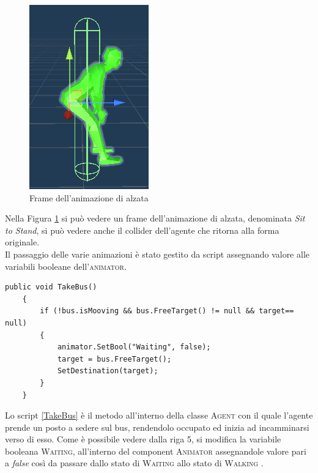 \documentclass[12pt, openany]{book}
\begin{document}
\begin{figure}[H]
	\centering
	\includegraphics[width=0.8\linewidth]{"Immagini/inPiedi.png"}
	\caption{Frame dell'animazione di alzata}
	\label{fig:Alzata}
\end{figure}
Nella Figura \ref{fig:Alzata} si può vedere un frame dell'animazione di alzata, denominata \emph{Sit to Stand}, si può vedere anche il collider dell'agente che ritorna alla forma originale.\\
Il passaggio delle varie animazioni è stato gestito da script assegnando valore alle variabili booleane dell'\textsc{animator}.
\begin{lstlisting}[language={[Sharp]C}, 
	caption={Metodo che permette agli agenti di prendere posto sull'autobus}, label={TakeBus}]
	public void TakeBus()
	{
		if (!bus.isMooving && bus.FreeTarget() != null && target== null)
		{
			animator.SetBool("Waiting", false);
			target = bus.FreeTarget();
			SetDestination(target);
		}
	}
\end{lstlisting}	
Lo script \ref{TakeBus} è il metodo all'interno della classe \textsc{Agent} con il quale l'agente prende un posto a sedere sul bus, rendendolo occupato ed inizia ad incamminarsi verso di esso. Come è possibile vedere dalla riga 5, si modifica la variabile booleana \textsc{Waiting}, all'interno del component \textsc{Animator} assegnandole valore pari a \emph{false} così da passare dallo stato di \textsc{Waiting} allo stato di \textsc{Walking} .  \newpage
\end{document}
